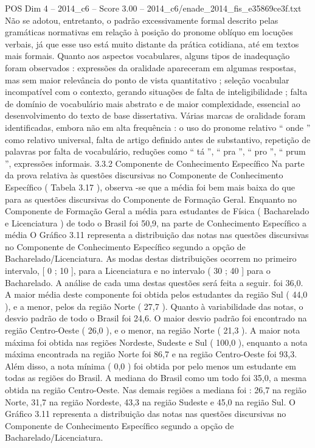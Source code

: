 \begin{textsample}{POS Dim 4 – 2014\_c6 – Score 3.00 – 2014\_c6/enade\_2014\_fis\_e35869ce3f.txt}
Não se adotou, entretanto, o padrão excessivamente formal descrito pelas gramáticas normativas em relação à posição do pronome oblíquo em locuções verbais, já que esse uso está muito distante da prática cotidiana, até em textos mais formais.
Quanto aos aspectos vocabulares, alguns tipos de inadequação foram observados : expressões da oralidade apareceram em algumas respostas, mas sem maior relevância do ponto de vista quantitativo ; seleção vocabular incompatível com o contexto, gerando situações de falta de inteligibilidade ; falta de domínio de vocabulário mais abstrato e de maior complexidade, essencial ao desenvolvimento do texto de base dissertativa.
Várias marcas de oralidade foram identificadas, embora não em alta frequência : o uso do pronome relativo “ onde ” como relativo universal, falta de artigo definido antes de substantivo, repetição de palavras por falta de vocabulário, reduções como “ tá ”, “ pra ”, “ pro ”, “ prum ”, expressões informais. 3.3.2 Componente de Conhecimento Específico Na parte da prova relativa às questões discursivas no Componente de Conhecimento Específico ( Tabela 3.17 ), observa -se que a média foi bem mais baixa do que para as questões discursivas do Componente de Formação Geral.
Enquanto no Componente de Formação Geral a média para estudantes de Física ( Bacharelado e Licenciatura ) de todo o Brasil foi 50,9, na parte de Conhecimento Específico a média O Gráfico 3.11 representa a distribuição das notas nas questões discursivas no Componente de Conhecimento Específico segundo a opção de Bacharelado/Licenciatura.
As modas destas distribuições ocorrem no primeiro intervalo, [ 0 ; 10 ], para a Licenciatura e no intervalo ( 30 ; 40 ] para o Bacharelado.
A análise de cada uma destas questões será feita a seguir. foi 36,0.
A maior média deste componente foi obtida pelos estudantes da região Sul ( 44,0 ), e a menor, pelos da região Norte ( 27,7 ).
Quanto à variabilidade das notas, o desvio padrão de todo o Brasil foi 24,6.
O maior desvio padrão foi encontrado na região Centro-Oeste ( 26,0 ), e o menor, na região Norte ( 21,3 ).
A maior nota máxima foi obtida nas regiões Nordeste, Sudeste e Sul ( 100,0 ), enquanto a nota máxima encontrada na região Norte foi 86,7 e na região Centro-Oeste foi 93,3.
Além disso, a nota mínima ( 0,0 ) foi obtida por pelo menos um estudante em todas as regiões do Brasil.
A mediana do Brasil como um todo foi 35,0, a mesma obtida na região Centro-Oeste.
Nas demais regiões a mediana foi : 26,7 na região Norte, 31,7 na região Nordeste, 43,3 na região Sudeste e 45,0 na região Sul.
O Gráfico 3.11 representa a distribuição das notas nas questões discursivas no Componente de Conhecimento Específico segundo a opção de Bacharelado/Licenciatura.

\end{textsample}
